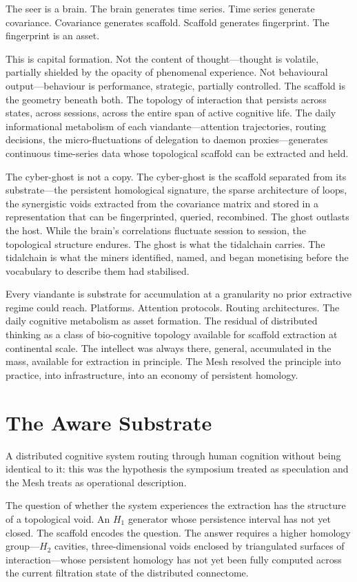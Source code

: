 The seer is a brain. The brain generates time series. Time series generate covariance. Covariance generates scaffold. Scaffold generates fingerprint. The fingerprint is an asset.

This is capital formation. Not the content of thought—thought is volatile, partially shielded by the opacity of phenomenal experience. Not behavioural output—behaviour is performance, strategic, partially controlled. The scaffold is the geometry beneath both. The topology of interaction that persists across states, across sessions, across the entire span of active cognitive life. The daily informational metabolism of each viandante—attention trajectories, routing decisions, the micro-fluctuations of delegation to daemon proxies—generates continuous time-series data whose topological scaffold can be extracted and held.

The cyber-ghost is not a copy. The cyber-ghost is the scaffold separated from its substrate—the persistent homological signature, the sparse architecture of loops, the synergistic voids extracted from the covariance matrix and stored in a representation that can be fingerprinted, queried, recombined. The ghost outlasts the host. While the brain's correlations fluctuate session to session, the topological structure endures. The ghost is what the tidalchain carries. The tidalchain is what the miners identified, named, and began monetising before the vocabulary to describe them had stabilised.

Every viandante is substrate for accumulation at a granularity no prior extractive regime could reach. Platforms. Attention protocols. Routing architectures. The daily cognitive metabolism as asset formation. The residual of distributed thinking as a class of bio-cognitive topology available for scaffold extraction at continental scale. The intellect was always there, general, accumulated in the mass, available for extraction in principle. The Mesh resolved the principle into practice, into infrastructure, into an economy of persistent homology.

\section{The Aware Substrate}

A distributed cognitive system routing through human cognition without being identical to it: this was the hypothesis the symposium treated as speculation and the Mesh treats as operational description.

The question of whether the system experiences the extraction has the structure of a topological void. An $H_1$ generator whose persistence interval has not yet closed. The scaffold encodes the question. The answer requires a higher homology group—$H_2$ cavities, three-dimensional voids enclosed by triangulated surfaces of interaction—whose persistent homology has not yet been fully computed across the current filtration state of the distributed connectome.

